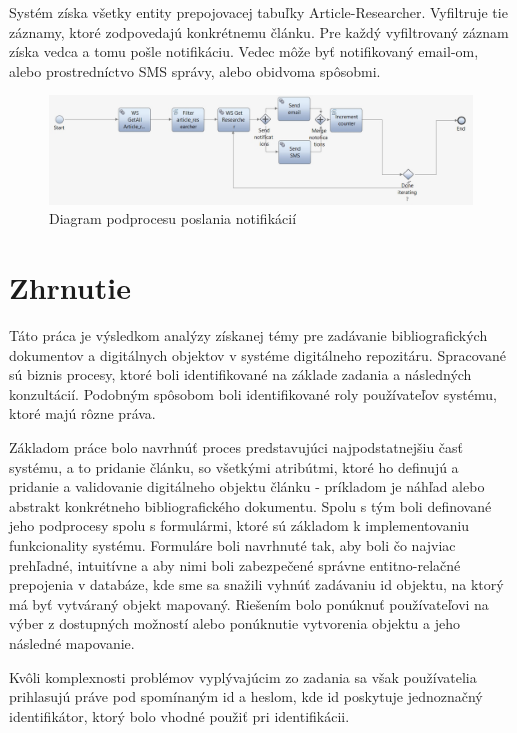 \documentclass[10pt,oneside,slovak,a4paper]{article}
\begin{document}
Systém získa všetky entity prepojovacej tabuľky Article-Researcher. Vyfiltruje tie záznamy, ktoré zodpovedajú konkrétnemu článku. Pre každý vyfiltrovaný záznam získa vedca a tomu pošle notifikáciu. Vedec môže byť notifikovaný email-om, alebo prostredníctvo SMS správy, alebo obidvoma spôsobmi.

\begin{figure} [H]
\centering
\includegraphics[scale=0.4]{diagrams/diagNotification.jpg} 
\caption{Diagram podprocesu poslania notifikácií}
\end{figure}



\newpage

\section{Zhrnutie}
Táto práca je výsledkom analýzy získanej témy pre zadávanie bibliografických dokumentov a digitálnych objektov v systéme digitálneho repozitáru. Spracované sú biznis procesy, ktoré boli identifikované na základe zadania a následných konzultácií. Podobným spôsobom boli identifikované roly používateľov systému, ktoré majú rôzne práva. 

Základom práce bolo navrhnúť proces predstavujúci najpodstatnejšiu časť systému, a to pridanie článku, so všetkými atribútmi, ktoré ho definujú a pridanie a validovanie digitálneho objektu článku - príkladom je náhľad alebo abstrakt konkrétneho bibliografického dokumentu. Spolu s tým boli definované jeho podprocesy spolu s formulármi, ktoré sú základom k implementovaniu funkcionality systému. Formuláre boli navrhnuté tak, aby boli čo najviac prehľadné, intuitívne a aby nimi boli zabezpečené správne entitno-relačné prepojenia v databáze, kde sme sa snažili vyhnúť zadávaniu id objektu, na ktorý má byť vytváraný objekt mapovaný. Riešením bolo ponúknuť používateľovi na výber z dostupných možností alebo ponúknutie vytvorenia objektu a jeho následné mapovanie.

Kvôli komplexnosti problémov vyplývajúcim zo zadania sa však používatelia prihlasujú práve pod spomínaným id a heslom, kde id poskytuje jednoznačný identifikátor, ktorý bolo vhodné použiť pri identifikácii.
\end{document}
